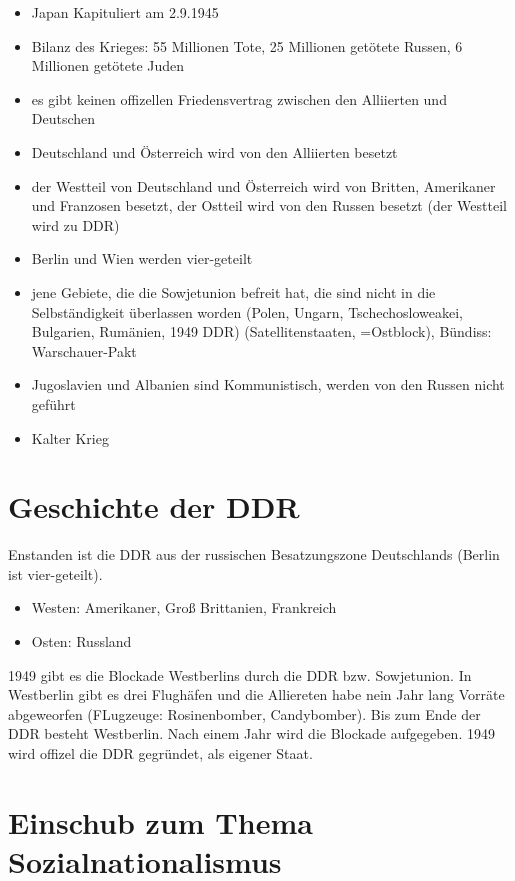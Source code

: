 \documentclass[a4paper,final]{book}
\begin{document}
\begin{itemize}
	\item Japan Kapituliert am 2.9.1945
	
	\item Bilanz des Krieges: 55 Millionen Tote, 25 Millionen getötete Russen, 6 Millionen getötete Juden
	\item es gibt keinen offizellen Friedensvertrag zwischen den Alliierten und Deutschen
	\item Deutschland und Österreich wird von den Alliierten besetzt
	\item der Westteil von Deutschland und Österreich wird von Britten, Amerikaner und Franzosen besetzt, der Ostteil wird von den Russen besetzt (der 
	Westteil wird zu DDR)
	\item Berlin und Wien werden vier-geteilt
	\item jene Gebiete, die die Sowjetunion befreit hat, die sind nicht in die Selbständigkeit überlassen worden (Polen, Ungarn, Tschechosloweakei, Bulgarien, Rumänien, 1949 DDR) (Satellitenstaaten, =Ostblock), Bündiss: Warschauer-Pakt
	\item Jugoslavien und Albanien sind Kommunistisch, werden von den Russen nicht geführt
	\item Kalter Krieg
	\end{itemize}

\newpage
\chapter{Geschichte der DDR}

Enstanden ist die DDR aus der russischen Besatzungszone Deutschlands (Berlin ist vier-geteilt).

	\begin{itemize}

		\item Westen: Amerikaner, Groß Brittanien, Frankreich
		\item Osten: Russland
	\end{itemize}
	
1949 gibt es die Blockade Westberlins durch die DDR bzw. Sowjetunion. In Westberlin gibt es drei Flughäfen und die Alliereten habe nein Jahr lang Vorräte abgeweorfen (FLugzeuge: Rosinenbomber, Candybomber). Bis zum Ende der DDR besteht Westberlin. Nach einem Jahr wird die Blockade aufgegeben. 1949 wird offizel die DDR gegründet, als eigener Staat.

\chapter{Einschub zum Thema Sozialnationalismus}
\end{document}
